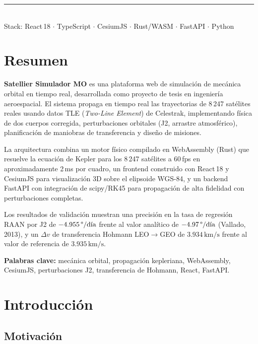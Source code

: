 \documentclass[12pt,a4paper]{article}
\begin{document}
\begin{titlepage}
  \vfill
  \rule{0.85\textwidth}{0.4pt}\\[0.4em]
  {\small Stack: React\,18 $\cdot$ TypeScript $\cdot$ CesiumJS $\cdot$ Rust/WASM $\cdot$ FastAPI $\cdot$ Python}
\end{titlepage}

\section*{Resumen}

\textbf{Satellier Simulador MO} es una plataforma web de simulaci\'on de mec\'anica orbital en tiempo real, desarrollada como proyecto de tesis en ingenier\'ia aeroespacial. El sistema propaga en tiempo real las trayectorias de 8\,247 sat\'elites reales usando datos TLE (\textit{Two-Line Element}) de Celestrak, implementando f\'isica de dos cuerpos corregida, perturbaciones orbitales (J2, arrastre atmosf\'erico), planificaci\'on de maniobras de transferencia y dise\~no de misiones.

La arquitectura combina un motor f\'isico compilado en WebAssembly (Rust) que resuelve la ecuaci\'on de Kepler para los 8\,247 sat\'elites a 60\,fps en aproximadamente 2\,ms por cuadro, un frontend construido con React\,18 y CesiumJS para visualizaci\'on 3D sobre el elipsoide WGS-84, y un backend FastAPI con integraci\'on de scipy/RK45 para propagaci\'on de alta fidelidad con perturbaciones completas.

Los resultados de validaci\'on muestran una precisi\'on en la tasa de regresi\'on RAAN por J2 de $-4.955\,\text{\textdegree/d\'ia}$ frente al valor anal\'itico de $-4.97\,\text{\textdegree/d\'ia}$ (Vallado, 2013), y un $\Delta v$ de transferencia Hohmann LEO$\to$GEO de $3.934\,\text{km/s}$ frente al valor de referencia de $3.935\,\text{km/s}$.

\medskip
\textbf{Palabras clave:} mec\'anica orbital, propagaci\'on kepleriana, WebAssembly, CesiumJS, perturbaciones J2, transferencia de Hohmann, React, FastAPI.

\tableofcontents
\newpage

\section{Introducci\'on}

\subsection{Motivaci\'on}
\end{document}
